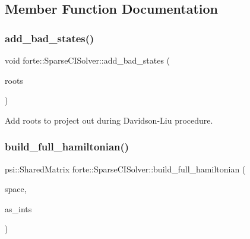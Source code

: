 \subsection{Member Function Documentation}
\mbox{\label{classforte_1_1_sparse_c_i_solver_ac543dcf856d538cd62441943ddca5b8d}} 
\subsubsection{\texorpdfstring{add\+\_\+bad\+\_\+states()}{add\_bad\_states()}}
{\footnotesize\ttfamily void forte\+::\+Sparse\+C\+I\+Solver\+::add\+\_\+bad\+\_\+states (\begin{DoxyParamCaption}\item[{std\+::vector$<$ std\+::vector$<$ std\+::pair$<$ size\+\_\+t, double $>$$>$$>$ \&}]{roots }\end{DoxyParamCaption})}



Add roots to project out during Davidson-\/\+Liu procedure. 

\mbox{\label{classforte_1_1_sparse_c_i_solver_afb31b5630245596421d2dc4f2dd35221}} 
\subsubsection{\texorpdfstring{build\+\_\+full\+\_\+hamiltonian()}{build\_full\_hamiltonian()}}
{\footnotesize\ttfamily psi\+::\+Shared\+Matrix forte\+::\+Sparse\+C\+I\+Solver\+::build\+\_\+full\+\_\+hamiltonian (\begin{DoxyParamCaption}\item[{const std\+::vector$<$ \mbox{\hyperlink{namespaceforte_a2076c63fd7b8732004d9e1442ce527c1}{Determinant}} $>$ \&}]{space,  }\item[{std\+::shared\+\_\+ptr$<$ \mbox{\hyperlink{classforte_1_1_active_space_integrals}{forte\+::\+Active\+Space\+Integrals}} $>$}]{as\+\_\+ints }\end{DoxyParamCaption})}



